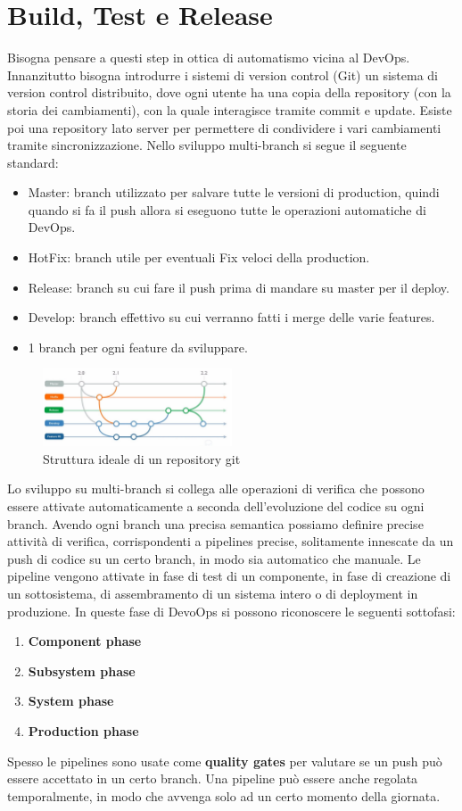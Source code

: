 \section{Build, Test e Release}
Bisogna pensare a questi step in ottica di automatismo vicina al DevOps.
Innanzitutto bisogna introdurre i sistemi di version control (Git) un sistema di
version control distribuito, dove ogni utente ha una copia della repository
(con la storia dei cambiamenti), con la quale interagisce tramite commit e update.
Esiste poi una repository lato server per permettere di condividere i vari
cambiamenti tramite sincronizzazione. Nello sviluppo multi-branch si segue il
seguente standard:
\begin{itemize}
      \item Master: branch utilizzato per salvare tutte le versioni di production,
            quindi quando si fa il push allora si eseguono tutte le operazioni
            automatiche di DevOps.
      \item HotFix: branch utile per eventuali Fix veloci della production.
      \item Release: branch su cui fare il push prima di mandare su master per
            il deploy.
      \item Develop: branch effettivo su cui verranno fatti i merge delle
            varie features.
      \item 1 branch per ogni feature da sviluppare.
\end{itemize}
\begin{figure}[!ht]
      \centering
      \includegraphics[width=0.5\textwidth]{img/devops/git.png}
      \caption{Struttura ideale di un repository git}
      \label{fig:git}
\end{figure}
Lo sviluppo su multi-branch si collega alle operazioni di verifica che possono
essere attivate automaticamente a seconda dell'evoluzione del codice su ogni branch.
Avendo ogni branch una precisa semantica possiamo definire precise attività di
verifica, corrispondenti a pipelines precise, solitamente innescate da un push di
codice su un certo branch, in modo sia automatico che manuale.
Le pipeline vengono attivate in fase di test di un componente, in fase di creazione
di un sottosistema, di assembramento di un sistema intero o di deployment in
produzione. In queste fase di DevoOps si possono riconoscere le seguenti sottofasi:
\begin{enumerate}
      \item \textbf{Component phase}
      \item \textbf{Subsystem phase}
      \item \textbf{System phase}
      \item \textbf{Production phase}
\end{enumerate}
Spesso le pipelines sono usate come \textbf{quality gates} per valutare se un push
può essere accettato in un certo branch. Una pipeline può essere anche regolata
temporalmente, in modo che avvenga solo ad un certo momento della giornata.
